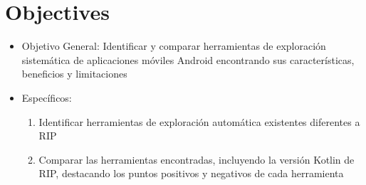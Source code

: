 \section{Objectives}
\label{sec:objectives}
\begin{itemize}
	\item Objetivo General:
		Identificar y comparar herramientas de exploración sistemática de aplicaciones móviles Android encontrando sus características, beneficios y limitaciones
	\item Específicos:
		\begin{enumerate}
			\item Identificar herramientas de exploración automática existentes diferentes a RIP
			\item Comparar las herramientas encontradas, incluyendo la versión Kotlin de RIP, destacando los puntos positivos y negativos de cada herramienta
		\end{enumerate}
\end{itemize}
